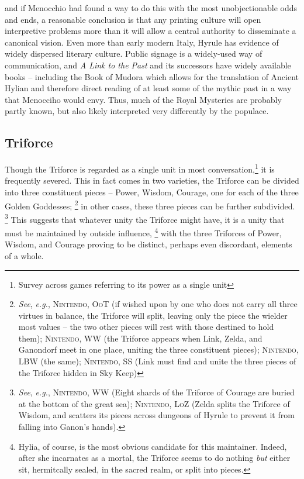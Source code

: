 \documentclass[../FGP.tex]{subfiles}
\begin{document}
and if Menocchio had found a way to do this with the most unobjectionable odds and ends, a reasonable conclusion is that any printing culture will open interpretive problems more than it will allow a central authority to disseminate a canonical vision. Even more than early modern Italy, Hyrule has evidence of widely dispersed literary culture. Public signage is a widely-used way of communication, and \emph{A Link to the Past} and its successors have widely available books -- including the Book of Mudora which allows for the translation of Ancient Hylian and therefore direct reading of at least some of the mythic past in a way that Menocciho would envy. Thus, much of the Royal Mysteries are probably partly known, but also likely interpreted very differently by the populace. 

\subsection{Triforce}Though the Triforce is regarded as a single unit in most conversation,\footnote{Survey across games referring to its power as a single unit} it is frequently severed. This in fact comes in two varieties, the Triforce can be divided into three constituent pieces -- Power, Wisdom, Courage, one for each of the three Golden Goddesses;%
  \footnote{\textit{See}, \textit{e.g.}, \textsc{Nintendo, OoT} (if wished upon by one who does not carry all three virtues in balance, the Triforce will split, leaving only the piece the wielder most values -- the two other pieces will rest with those destined to hold them); \textsc{Nintendo, WW} (the Triforce appears when Link, Zelda, and Ganondorf meet in one place, uniting the three constituent pieces); \textsc{Nintendo, LBW} (the same); \textsc{Nintendo, SS} (Link must find and unite the three pieces of the Triforce hidden in Sky Keep)}
in other cases, these three pieces can be further subdivided.%
  \footnote{\textit{See}, \textit{e.g.}, \textsc{Nintendo, WW} (Eight shards of the Triforce of Courage are buried at the bottom of the great sea); \textsc{Nintendo, LoZ} (Zelda splits the Triforce of Wisdom, and scatters its pieces across dungeons of Hyrule to prevent it from falling into Ganon's hands).}
This suggests that whatever unity the Triforce might have, it is a unity that must be maintained by outside influence,%
  \footnote{Hylia, of course, is the most obvious candidate for this maintainer. Indeed, after she incarnates as a mortal, the Triforce seems to do nothing \emph{but} either sit, hermitcally sealed, in the sacred realm, or split into pieces.}
with the three Triforces of Power, Wisdom, and Courage proving to be distinct, perhaps even discordant, elements of a whole. 
\end{document}
